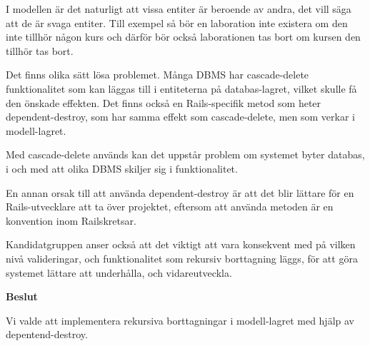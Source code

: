 I modellen är det naturligt att vissa entiter är beroende av andra, det vill säga att de är svaga entiter. Till exempel så bör en laboration inte existera om den inte tillhör någon kurs och därför bör också laborationen tas bort om kursen den tillhör tas bort. 

Det finns olika sätt lösa problemet. Många DBMS har cascade-delete funktionalitet som kan läggas till i entiteterna på databas-lagret, vilket skulle få den önskade effekten. Det finns också en Rails-specifik metod som heter dependent-destroy, som har samma effekt som cascade-delete, men som verkar i modell-lagret.

Med cascade-delete används kan det uppstår problem om systemet byter databas, i och med att olika DBMS skiljer sig i funktionalitet.

En annan orsak till att använda dependent-destroy är att det blir lättare för en Rails-utvecklare att ta över projektet, eftersom att använda metoden är en konvention inom Railskretsar.

Kandidatgruppen anser också att det viktigt att vara konsekvent med på vilken nivå valideringar, och funktionalitet som rekursiv borttagning läggs, för att göra systemet lättare att underhålla, och vidareutveckla.   

\begin{flushright}
  
  \textbf{Beslut}
  
  Vi valde att implementera rekursiva borttagningar i modell-lagret med hjälp av depentend-destroy.
\end{flushright}
